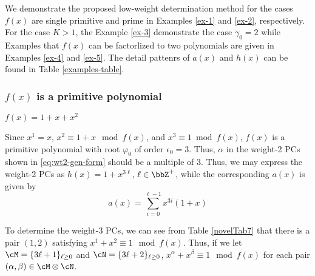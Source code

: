 We demonstrate the proposed low-weight determination method for the cases $f(x)$ are single primitive and prime in Examples \ref{ex-1} and \ref{ex-2}, respectively. For the case $K>1$, the Example \ref{ex-3} demonstrate the case $\gamma_0 = 2$ while Examples that $f(x)$ can be factorlized to two polynomials are given in Examples \ref{ex-4} and \ref{ex-5}. The detail pattenrs of $a(x)$ and $h(x)$ can be found in Table \ref{examples-table}.

\subsubsection{$f(x)$ is a primitive polynomial}

\begin{example}$f(x)=1+x+x^2$
	
Since $x^1=x$, $x^2 \equiv 1+x \mod f(x)$, and $x^3 \equiv 1 \bmod f(x)$, $f(x)$ is a primitive polynomial with root $\varphi_0$ of order $\epsilon_0=3$. Thus, $\alpha$ in the weight-2 PCs shown in \eqref{eq:wt2-gen-form} should be a multiple of $3$. Thus, we may express the weight-2 PCs as $h(x)=1+x^{3\ell}$, $\ell \in \bbZ^+$, while the corresponding $a(x)$ is given by 
\begin{equation*}
	a(x)=\sum_{i=0}^{\ell-1} x^{3i}(1+x)
\end{equation*}

To determine the weight-3 PCs, we can see from Table \ref{novelTab7} that there is a pair $(1,2)$ satisfying $x^1+x^2 \equiv 1 \mod f(x)$. Thus, if we let $\cM = \{3\ell+1\}_{\ell\geq 0}$ and $\cN = \{3\ell+2\}_{\ell\geq 0}$, $x^\alpha+x^\beta \equiv 1 \mod f(x)$ for each pair $(\alpha,\beta) \in \cM\otimes\cN$.
\label{Ex:1}
\end{example}


